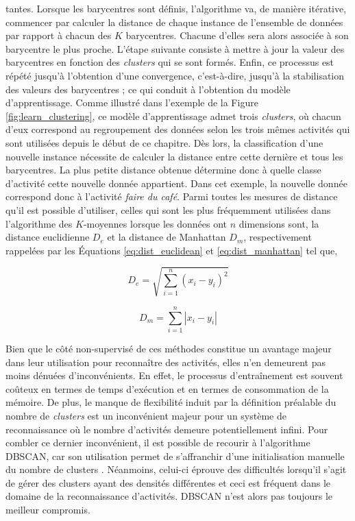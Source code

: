 \noindent tantes. Lorsque les barycentres sont définis, l'algorithme va, de manière itérative, commencer par calculer la distance de chaque instance de l'ensemble de données par rapport à chacun des $K$ barycentres. Chacune d'elles sera alors associée à son barycentre le plus proche. L'étape suivante consiste à mettre à jour la valeur des barycentres en fonction des \textit{clusters} qui se sont formés. Enfin, ce processus est répété jusqu'à l'obtention d'une convergence, c'est-à-dire, jusqu'à la stabilisation des valeurs des barycentres ; ce qui conduit à l'obtention du modèle d'apprentissage. Comme illustré dans l'exemple de la Figure \ref{fig:learn_clustering}, ce modèle d'apprentissage admet trois \textit{clusters}, où chacun d'eux correspond au regroupement des données selon les trois mêmes activités qui sont utilisées depuis le début de ce chapitre. Dès lors, la classification d'une nouvelle instance nécessite de calculer la distance entre cette dernière et tous les barycentres. La plus petite distance obtenue détermine donc à quelle classe d'activité cette nouvelle donnée appartient. Dans cet exemple, la nouvelle donnée correspond donc à l'activité \og \textit{faire du café}\fg. Parmi toutes les mesures de distance qu'il est possible d'utiliser, celles qui sont les plus fréquemment utilisées dans l'algorithme des $K$-moyennes lorsque les données ont $n$ dimensions sont, la distance euclidienne $D_e$ et la distance de Manhattan $D_m$, respectivement rappelées par les Équations \ref{eq:dist_euclidean} et \ref{eq:dist_manhattan} tel que,

\begin{equation}
	\label{eq:dist_euclidean}
	D_e = \sqrt{\sum_{i=1}^{n}(x_i-y_i)^2}
\end{equation}

\begin{equation}
	\label{eq:dist_manhattan}
	D_m = \sum_{i=1}^{n}\left|x_i-y_i\right|
\end{equation}

Bien que le côté non-supervisé de ces méthodes constitue un avantage majeur dans leur utilisation pour reconnaître des activités, elles n'en demeurent pas moins dénuées d'inconvénients. En effet, le processus d'entraînement est souvent coûteux en termes de temps d'exécution et en termes de consommation de la mémoire. De plus, le manque de flexibilité induit par la définition préalable du nombre de \textit{clusters} est un inconvénient majeur pour un système de reconnaissance où le nombre d'activités demeure potentiellement infini. Pour combler ce dernier inconvénient, il est possible de recourir à l'algorithme \ac{DBSCAN}, car son utilisation permet de s'affranchir d'une initialisation manuelle du nombre de clusters \citep{Gan2015}. Néanmoins, celui-ci éprouve des difficultés lorsqu'il s'agit de gérer des clusters ayant des densités différentes et ceci est fréquent dans le domaine de la reconnaissance d'activités. \acs{DBSCAN} n'est alors pas toujours le meilleur compromis.

